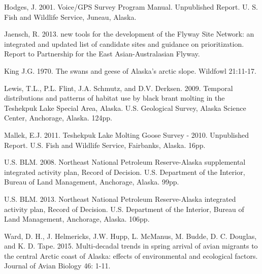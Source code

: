\documentclass[
]{article}
\begin{document}
Hodges, J. 2001. Voice/GPS Survey Program Manual. Unpublished Report. U.
S. Fish and Wildlife Service, Juneau, Alaska.

Jaensch, R. 2013. new tools for the development of the Flyway Site
Network: an integrated and updated list of candidate sites and guidance
on prioritization. Report to Partnership for the East Asian-Australasian
Flyway.

King J.G. 1970. The swans and geese of Alaska's arctic slope. Wildfowl
21:11-17.

Lewis, T.L., P.L. Flint, J.A. Schmutz, and D.V. Derksen. 2009. Temporal
distributions and patterns of habitat use by black brant molting in the
Teshekpuk Lake Special Area, Alaska. U.S. Geological Survey, Alaska
Science Center, Anchorage, Alaska. 124pp.

Mallek, E.J. 2011. Teshekpuk Lake Molting Goose Survey - 2010.
Unpublished Report. U.S. Fish and Wildlife Service, Fairbanks, Alaska.
16pp.

U.S. BLM. 2008. Northeast National Petroleum Reserve-Alaska supplemental
integrated activity plan, Record of Decision. U.S. Department of the
Interior, Bureau of Land Management, Anchorage, Alaska. 99pp.

U.S. BLM. 2013. Northeast National Petroleum Reserve-Alaska integrated
activity plan, Record of Decision. U.S. Department of the Interior,
Bureau of Land Management, Anchorage, Alaska. 106pp.

Ward, D. H., J. Helmericks, J.W. Hupp, L. McManus, M. Budde, D. C.
Douglas, and K. D. Tape. 2015. Multi-decadal trends in spring arrival of
avian migrants to the central Arctic coast of Alaska: effects of
environmental and ecological factors. Journal of Avian Biology 46: 1-11.
\newpage \footnotesize

\begingroup\fontsize{7}{9}\selectfont
\end{document}
